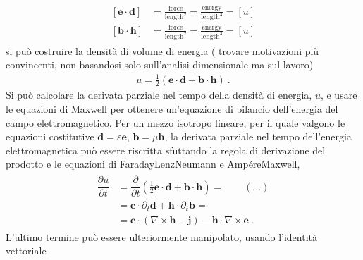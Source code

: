 \documentclass[letterpaper,10pt,english]{jupyterBook}
\begin{document}
\begin{equation*}
\begin{split}\begin{aligned}
\left[\mathbf{e} \cdot \mathbf{d}\right] & = \frac{\text{force}}{\text{length}^2} = \frac{\text{energy}}{\text{length}^3} = [u] \\
[\mathbf{b} \cdot \mathbf{h}] & = \frac{\text{force}}{\text{length}^2} = \frac{\text{energy}}{\text{length}^3} = [u]
\end{aligned}\end{split}
\end{equation*}
\sphinxAtStartPar
si può costruire la densità di volume di energia  ( trovare motivazioni più convincenti, non basandosi solo sull’analisi dimensionale ma sul lavoro)
\begin{equation*}
\begin{split}u = \frac{1}{2} \left( \mathbf{e} \cdot \mathbf{d} + \mathbf{b} \cdot \mathbf{h} \right) \ .\end{split}
\end{equation*}
\sphinxAtStartPar
Si può calcolare la derivata parziale nel tempo della densità di energia, \(u\), e usare le equazioni di Maxwell per ottenere un’equazione di bilancio dell’energia del campo elettromagnetico. Per un mezzo isotropo lineare, per il quale valgono le equazioni costitutive \(\mathbf{d} = \varepsilon \mathbf{e}\), \(\mathbf{b} = \mu \mathbf{h}\), la derivata parziale nel tempo dell’energia elettromagnetica può essere riscritta sfuttando la regola di derivazione del prodotto e le equazioni di Faraday\sphinxhyphen{}Lenz\sphinxhyphen{}Neumann e Ampére\sphinxhyphen{}Maxwell,
\begin{equation*}
\begin{split}\begin{aligned}
\dfrac{\partial u}{\partial t} & = \dfrac{\partial}{\partial t}\left( \frac{1}{2} \mathbf{e} \cdot \mathbf{d} + \mathbf{b} \cdot \mathbf{h} \right) =  \qquad (...) \\
& = \mathbf{e} \cdot \partial_t \mathbf{d} + \mathbf{h} \cdot \partial_t \mathbf{b} = \\
& = \mathbf{e} \cdot (\nabla \times \mathbf{h} - \mathbf{j}) - \mathbf{h} \cdot \nabla \times \mathbf{e} \ .
\end{aligned}\end{split}
\end{equation*}
\sphinxAtStartPar
L’ultimo termine può essere ulteriormente manipolato, usando l’identità vettoriale
\end{document}
